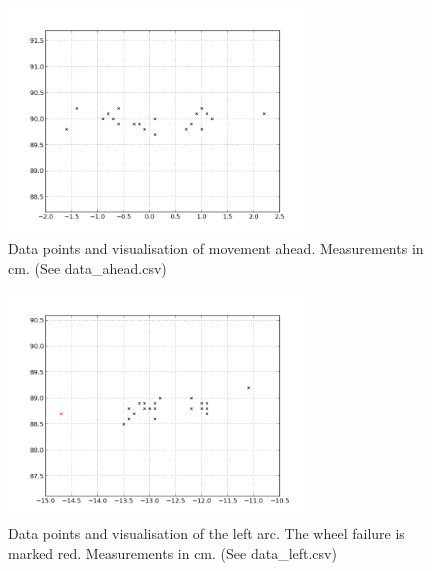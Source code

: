 \documentclass{scrartcl}
\begin{document}
 \begin{figure}[h]
\centering
\begin{minipage}{.5\textwidth}
  \centering
\end{minipage}%
\begin{minipage}{.5\textwidth}
  \centering
   \includegraphics[width= 8cm]{img/data_ahead.png}  
\end{minipage}
\caption{Data points and visualisation of movement ahead. Measurements in cm. (See data\_ahead.csv)}
\label{fig:data_ahead}
\end{figure}

\begin{figure}[h]
\centering
\begin{minipage}{.5\textwidth}
  \centering
\end{minipage}%
\begin{minipage}{.5\textwidth}
  \centering
   \includegraphics[width= 8cm]{img/data_left.png}  
\end{minipage}
\caption{Data points and visualisation of the left arc. The wheel failure is marked red. Measurements in cm.  (See data\_left.csv)}
\label{fig:data_left}
\end{figure}
\end{document}
